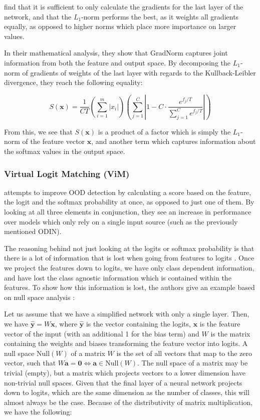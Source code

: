 \documentclass[UKenglish]{uiomasterthesis} %
\theoremstyle{definition}
\begin{document}
\cite{gradnorm} find that it is sufficient to only calculate the gradients for the last layer of the network, and that the $L_1$-norm performs the best, as it weights all gradients equally, as opposed to higher norms which place more importance on larger values.

In their mathematical analysis, they show that GradNorm captures joint information from both the feature and output space. By decomposing the $L_1$-norm of gradients of weights of the last layer with regards to the Kullback-Leibler divergence, they reach the following equality:

\begin{equation}
S(\bm{x}) = \frac{1}{CT}  \left(\sum_{i=1}^m |x_i|\right) \left(\sum_{j=1}^C \left|1 - C \cdot \frac{e^{f_j / T}}{\sum_{j=1}^C e^{{f_{j}} / T}}\right|\right)
\label{eq:decomp}
\end{equation}

From this, we see that $S(\bm{x})$ is a product of a factor which is simply the $L_1$-norm of the feature vector $\bm{x}$, and another term which captures information about the softmax values in the output space.
\\

\subsubsection{Virtual Logit Matching (ViM)}

\cite{vim} attempts to improve OOD detection by calculating a score based on the feature, the logit and the softmax probability at once, as opposed to just one of them. By looking at all three elements in conjunction, they see an increase in performance over models which only rely on a single input source (such as the previously mentioned ODIN).

The reasoning behind not just looking at the logits or softmax probability is that there is a lot of information that is lost when going from features to logits \cite{vim}. Once we project the features down to logits, we have only class dependent information, and have lost the class agnostic information which is contained within the features. To show how this information is lost, the authors give an example based on null space analysis \cite{nusa}:

Let us assume that we have a simplified network with only a single layer. Then, we have $\hat{\bm{y}} = W \bm{x}$, where $\hat{\bm{y}}$ is the vector containing the logits, $\bm{x}$ is the feature vector of the input (with an additional 1 for the bias term) and $W$ is the matrix containing the weights and biases transforming the feature vector into logits. A null space $\text{Null}(W)$ of a matrix $W$ is the set of all vectors that map to the zero vector, such that $W \bm{a} = \bm{0} \iff \bm{a} \in \text{Null}(W)$. The null space of a matrix may be trivial (empty), but a matrix which projects vectors to a lower dimension have non-trivial null spaces. Given that the final layer of a neural network projects down to logits, which are the same dimension as the number of classes, this will almost always be the case. Because of the distributivity of matrix multiplication, we have the following:
\end{document}
